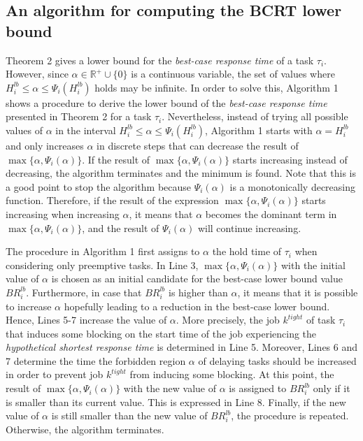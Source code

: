 \documentclass[fleqn]{article}
\begin{document}
\subsection{An algorithm for computing the BCRT lower bound}

Theorem 2 gives a lower bound for the \textit{best-case response time} of a task $\tau_i$. However, since $\alpha \in \mathbb{R^+} \cup \{ 0 \}$ is a continuous variable, the set of values where $H_i^{lb} \leq \alpha \leq \Psi_i(H_i^{lb})$ holds may be infinite. In order to solve this, Algorithm 1 shows a procedure to derive the lower bound of the \textit{best-case response time}  presented in Theorem 2 for a task $\tau_i$. Nevertheless, instead of trying all possible values of $\alpha$ in the interval $H_i^{lb} \leq \alpha \leq \Psi_i(H_i^{lb})$, Algorithm 1 starts with $\alpha=H_i^{lb}$ and only increases $\alpha$ in discrete steps that can decrease the result of $\max \{ \alpha, \Psi_i(\alpha)\}$. If the result of $\max \{ \alpha, \Psi_i(\alpha)\}$ starts increasing instead of decreasing, the algorithm terminates and the minimum is found. Note that this is a good point to stop the algorithm because $\Psi_i(\alpha)$ is a monotonically decreasing function. Therefore, if the result of the expression $\max \{ \alpha, \Psi_i(\alpha)\}$ starts increasing when increasing $\alpha$, it means that $\alpha$ becomes the dominant term in $\max \{ \alpha, \Psi_i(\alpha)\}$, and the result of $\Psi_i(\alpha)$ will continue increasing.


The procedure in Algorithm 1 first assigns to $\alpha$ the hold time of $\tau_i$ when considering only preemptive tasks. In Line 3, $\max \{ \alpha, \Psi_i(\alpha)\}$ with the initial value of $\alpha$ is chosen as an initial candidate for the best-case lower bound value $BR_i^{lb}$. Furthermore, in case that $BR^{lb}_i$ is higher than $\alpha$, it means that it is possible to increase $\alpha$ hopefully leading to a reduction in the best-case lower bound. Hence, Lines 5-7 increase the value of $\alpha$. More precisely, the job $k^{tight}$ of task $\tau_i$ that induces some blocking on the start time of the job experiencing the \textit{hypothetical shortest response time} is determined in Line 5. Moreover, Lines 6 and 7 determine the time the forbidden region $\alpha$ of delaying tasks should be increased in order to prevent job $k^{tight}$ from inducing some blocking. At this point, the result of $\max \{ \alpha, \Psi_i(\alpha)\}$ with the new value of $\alpha$ is assigned to $BR^{lb}_i$ only if it is smaller than its current value. This is expressed in Line 8. Finally, if the new value of $\alpha$ is still smaller than the new value of $BR^{lb}_i$, the procedure is repeated. Otherwise, the algorithm terminates.
\end{document}
